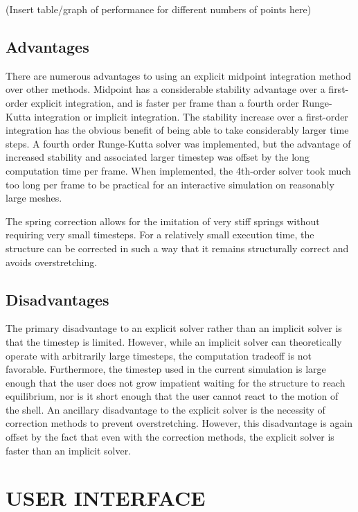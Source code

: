 \documentclass{thesis}
\begin{document}
(Insert table/graph of performance for different numbers of points here)

\section{Advantages}
There are numerous advantages to using an explicit midpoint integration method over other methods.  Midpoint has a considerable stability
advantage over a first-order explicit integration, and is faster per frame than a fourth order Runge-Kutta integration or implicit
integration.  The stability increase over a first-order integration has the obvious benefit of being able to take considerably larger
time steps.  A fourth order Runge-Kutta solver was implemented, but the advantage of increased stability and associated larger timestep
was offset by the long computation time per frame.  When implemented, the 4th-order solver took much too long per frame to be practical
for an interactive simulation on reasonably large meshes.

The spring correction allows for the imitation of very stiff springs without requiring very small timesteps.  For a relatively small
execution time, the structure can be corrected in such a way that it remains structurally correct and avoids overstretching.

\section{Disadvantages}
The primary disadvantage to an explicit solver rather than an implicit solver is that the timestep is limited.  However, while an
implicit solver can theoretically operate with arbitrarily large timesteps, the computation tradeoff is not favorable.  Furthermore,
the timestep used in the current simulation is large enough that the user does not grow impatient waiting for the structure to reach
equilibrium, nor is it short enough that the user cannot react to the motion of the shell.  An ancillary disadvantage to the
explicit solver is the necessity of correction methods to prevent overstretching.  However, this disadvantage is again offset by the
fact that even with the correction methods, the explicit solver is faster than an implicit solver.



\chapter{USER INTERFACE}
\end{document}
